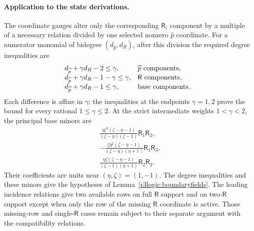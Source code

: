\documentclass[11pt,a4paper]{article}
\numberwithin{equation}{section}
\theoremstyle{plain}
\theoremstyle{definition}
\theoremstyle{remark}
\begin{document}
\paragraph{Application to the state derivations.}
The coordinate gauges alter only the corresponding $\mathsf R_i$ component by
a multiple of a necessary relation divided by one selected
nonzero $\widehat p$ coordinate. For a numerator monomial of bidegree
$(d_{\widehat p},d_R)$, after this division the required degree inequalities are
\[
 \begin{array}{ll}
 d_{\widehat p}+\gamma d_R-2\le\gamma,&\widehat p\hbox{ components},\\
 d_{\widehat p}+\gamma d_R-1-\gamma\le\gamma,&\mathsf R\hbox{ components},\\
 d_{\widehat p}+\gamma d_R-1\le\gamma,&\hbox{base components}.
 \end{array}
\]
Each difference is affine in $\gamma$; the inequalities at the endpoints
$\gamma=1,2$ prove the bound for every rational
$1\le\gamma\le2$. At the strict intermediate weights
$1<\gamma<2$, the principal base minors are
\[
 \begin{aligned}
 &\frac{\eta \zeta ^2(\zeta -\eta -1)}{(\zeta -\eta )(\zeta -1)}\mathsf R_1\mathsf R_2,\\
 &-\frac{\zeta \eta ^2(\zeta -\eta -1)}{(\zeta -\eta )(\eta +1)}\mathsf R_1\mathsf R_3,\\
 &\frac{\eta \zeta (\zeta -\eta -1)}{(\zeta -1)(\eta +1)}\mathsf R_2\mathsf R_3.
 \end{aligned}
\]
Their coefficients are units near $(\eta ,\zeta )=(1,-1)$. The degree inequalities and these minors give the hypotheses of
Lemma~\ref{r3logic:boundaryfields}. The leading incidence relations
give two available rows on full $\mathsf R$ support and on two-$\mathsf R$ support
except when only the row of the missing $\mathsf R$ coordinate is active.
Those missing-row and single-$\mathsf R$ cases remain subject to their
separate argument with the compatibility relations.
\end{document}
